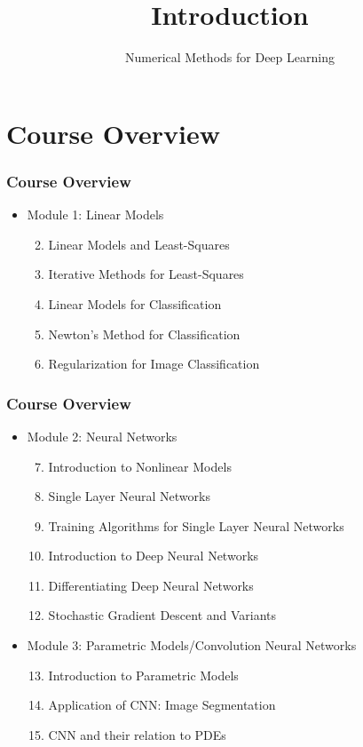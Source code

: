 \documentclass[12pt,fleqn]{beamer}
\title[Intro]{Introduction}
\subtitle{Numerical Methods for Deep Learning}
\date{}
\begin{document}
\makebeamertitle
\section{Course Overview} 
\label{sec:course_overview}
\begin{frame}
\frametitle{Course Overview}
\begin{itemize}
\item Module 1: Linear Models
\begin{enumerate}
	\setcounter{enumi}{1}	
\item Linear Models and Least-Squares
\item Iterative Methods for Least-Squares
\item Linear Models for Classification
\item Newton's Method for Classification
\item Regularization for Image Classification
\end{enumerate}
\end{itemize}

\end{frame}
\begin{frame}
\frametitle{Course Overview}

\begin{itemize}
\item Module 2: Neural Networks
\begin{enumerate}
	\setcounter{enumi}{6}
\item Introduction to Nonlinear Models
\item Single Layer Neural Networks
\item Training Algorithms for Single Layer Neural Networks
\item Introduction to Deep Neural Networks
\item Differentiating Deep Neural Networks
\item Stochastic Gradient Descent and Variants
\end{enumerate}
\item Module 3: Parametric Models/Convolution Neural Networks
\begin{enumerate}
	\setcounter{enumi}{12}
	\item Introduction to Parametric Models
	\item Application of CNN: Image Segmentation
	\item CNN and their relation to PDEs
\end{enumerate}
\end{itemize}
\end{frame}
\end{document}
